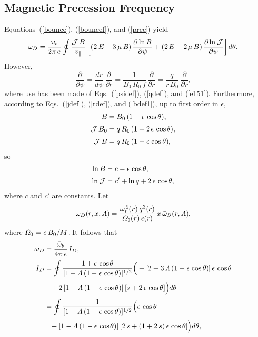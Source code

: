 \documentclass[12pt,prb,aps,notitlepage]{revtex4-1}
\begin{document}
\subsection{Magnetic Precession Frequency}
Equations~(\ref{bounce}), (\ref{bouncef}), and (\ref{prec}) yield
\begin{equation}
\omega_D = \frac{\omega_b}{2\pi\,e}\oint
\frac{{\cal J}\,B}{|v_\parallel|}\left[(2\,E-3\,\mu\,B)\,\frac{\partial\ln B}{\partial\psi} + (2\,E-2\,\mu\,B)\,\frac{\partial\ln{\cal J}}{\partial\psi}\right] d\theta.
\end{equation}
However,
\begin{equation}
\frac{\partial}{\partial\psi} = \frac{dr}{d\psi}\,\frac{\partial}{\partial r} = \frac{1}{B_0\,R_0\,f}\,\frac{\partial}{\partial r} = \frac{q}{r\,B_0}\,\frac{\partial}{\partial r},
\end{equation}
where use has been made of Eqs.~(\ref{psidef}), (\ref{qdef}), and (\ref{e151}). Furthermore, according to Eqs.~(\ref{jdef}), (\ref{rdef}), and
(\ref{bdef1}), up to first order in $\epsilon$, 
\begin{align}\label{evv}
B&= B_0\,(1-\epsilon\,\cos\theta),\\[0.5ex]
{\cal J}\,B_0&=q\,R_0\,(1+2\,\epsilon\,\cos\theta),\\[0.5ex]
{\cal J}\,B &= q\,R_0\,(1+\epsilon\,\cos\theta),\label{exc}
\end{align}
so
\begin{align}
\ln B &= c - \epsilon\,\cos\theta,\\[0.5ex]
\ln {\cal J} &= c' + \ln q + 2\,\epsilon\,\cos\theta,
\end{align}
where $c$ and $c'$ are constants. Let 
\begin{equation}
\omega_D(r,x,{\mit\Lambda}) = \frac{\omega_t^{\,2}(r)\,q^3(r)}{{\mit\Omega}_0(r)\,\epsilon(r)}\,x\,\bar{\omega}_D(r,{\mit\Lambda}),
\end{equation}
where ${\mit\Omega}_0=e\,B_0/M$. 
 It follows that
\begin{align}
\bar{\omega}_D&=\frac{\bar{\omega}_b}{4\pi\,\epsilon} \,I_D,\\[0.5ex]
I_D&= \oint \frac{1+\epsilon\,\cos\theta}{[1-{\mit\Lambda}\,(1-\epsilon\,\cos\theta)]^{1/2}}
\Big(-[2-3\,{\mit\Lambda}\,(1-\epsilon\,\cos\theta)]\,\epsilon\,\cos\theta\nonumber\\[0.5ex]&\phantom{=}
+ 2\,[1-{\mit\Lambda}\,(1-\epsilon\,\cos\theta)]\,[s+2\,\epsilon\,\cos\theta]\Big)d\theta\nonumber\\[0.5ex]
&= \oint \frac{1}{[1-{\mit\Lambda}\,(1-\epsilon\,\cos\theta)]^{1/2}}
\Big(\epsilon\,\cos\theta\nonumber\\[0.5ex]&\phantom{=}
+ [1-{\mit\Lambda}\,(1-\epsilon\,\cos\theta)]\,[2\,s+(1+2\,s)\,\epsilon\,\cos\theta]\Big)d\theta,
\end{align}
\end{document}
